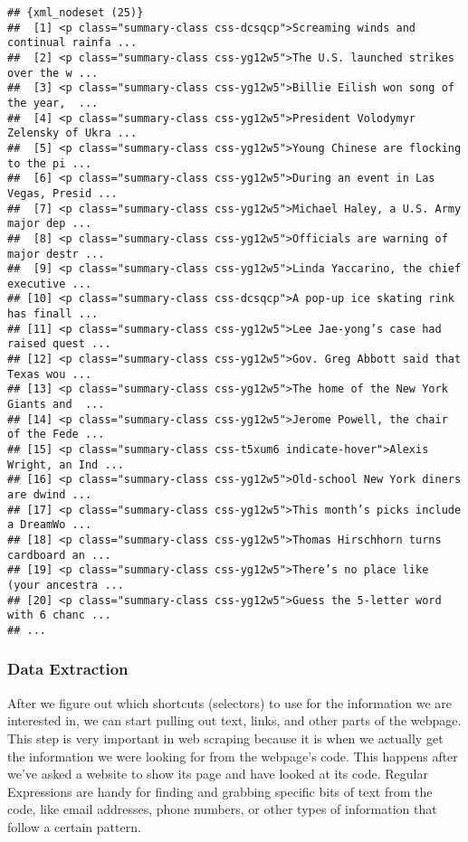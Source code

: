 \documentclass[
]{article}
\begin{document}
\begin{verbatim}
## {xml_nodeset (25)}
##  [1] <p class="summary-class css-dcsqcp">Screaming winds and continual rainfa ...
##  [2] <p class="summary-class css-yg12w5">The U.S. launched strikes over the w ...
##  [3] <p class="summary-class css-yg12w5">Billie Eilish won song of the year,  ...
##  [4] <p class="summary-class css-yg12w5">President Volodymyr Zelensky of Ukra ...
##  [5] <p class="summary-class css-yg12w5">Young Chinese are flocking to the pi ...
##  [6] <p class="summary-class css-yg12w5">During an event in Las Vegas, Presid ...
##  [7] <p class="summary-class css-yg12w5">Michael Haley, a U.S. Army major dep ...
##  [8] <p class="summary-class css-yg12w5">Officials are warning of major destr ...
##  [9] <p class="summary-class css-yg12w5">Linda Yaccarino, the chief executive ...
## [10] <p class="summary-class css-dcsqcp">A pop-up ice skating rink has finall ...
## [11] <p class="summary-class css-yg12w5">Lee Jae-yong’s case had raised quest ...
## [12] <p class="summary-class css-yg12w5">Gov. Greg Abbott said that Texas wou ...
## [13] <p class="summary-class css-yg12w5">The home of the New York Giants and  ...
## [14] <p class="summary-class css-yg12w5">Jerome Powell, the chair of the Fede ...
## [15] <p class="summary-class css-t5xum6 indicate-hover">Alexis Wright, an Ind ...
## [16] <p class="summary-class css-yg12w5">Old-school New York diners are dwind ...
## [17] <p class="summary-class css-yg12w5">This month’s picks include a DreamWo ...
## [18] <p class="summary-class css-yg12w5">Thomas Hirschhorn turns cardboard an ...
## [19] <p class="summary-class css-yg12w5">There’s no place like (your ancestra ...
## [20] <p class="summary-class css-yg12w5">Guess the 5-letter word with 6 chanc ...
## ...
\end{verbatim}

\hypertarget{data-extraction}{%
\subsubsection{Data Extraction}\label{data-extraction}}

After we figure out which shortcuts (selectors) to use for the
information we are interested in, we can start pulling out text, links,
and other parts of the webpage. This step is very important in web
scraping because it is when we actually get the information we were
looking for from the webpage's code. This happens after we've asked a
website to show its page and have looked at its code. Regular
Expressions are handy for finding and grabbing specific bits of text
from the code, like email addresses, phone numbers, or other types of
information that follow a certain pattern.
\end{document}
